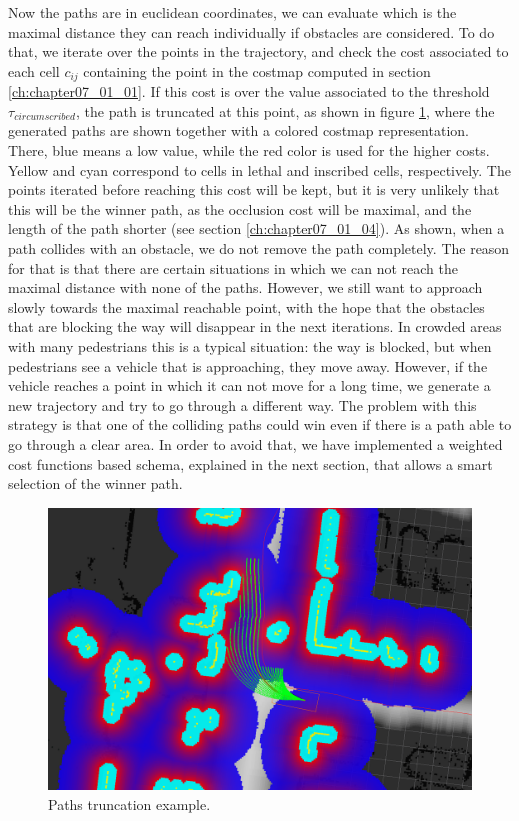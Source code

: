 Now the paths are in euclidean coordinates, we can evaluate which is the maximal distance they can reach individually if obstacles are considered. To do that, we iterate over the points in the trajectory, and check the cost associated to each cell $c_{ij}$ containing the point in the costmap computed in section \ref{ch:chapter07_01_01}. If this cost is over the value associated to the threshold $\tau_{circumscribed}$, the path is truncated at this point, as shown in figure \ref{fig:cp07_path_truncation}, where the generated paths are shown together with a colored costmap representation. There, blue means a low value, while the red color is used for the higher costs. Yellow and cyan correspond to cells in lethal and inscribed cells, respectively. The points iterated before reaching this cost will be kept, but it is very unlikely that this will be the winner path, as the occlusion cost will be maximal, and the length of the path shorter (see section \ref{ch:chapter07_01_04}). 
As shown, when a path collides with an obstacle, we do not remove the path completely. The reason for that is that there are certain situations in which we can not reach the maximal distance with none of the paths. However, we still want to approach slowly towards the maximal reachable point, with the hope that the obstacles that are blocking the way will disappear in the next iterations. In crowded areas with many pedestrians this is a typical situation: the way is blocked, but when pedestrians see a vehicle that is approaching, they move away. However, if the vehicle reaches a point in which it can not move for a long time, we generate a new trajectory and try to go through a different way.
The problem with this strategy is that one of the colliding paths could win even if there is a path able to go through a clear area. In order to avoid that, we have implemented a weighted cost functions based schema, explained in the next section, that allows a smart selection of the winner path.

\begin{figure}[h!]
\centering
\includegraphics{example15}
\caption{Paths truncation example.}\label{fig:cp07_path_truncation}
\end{figure}

